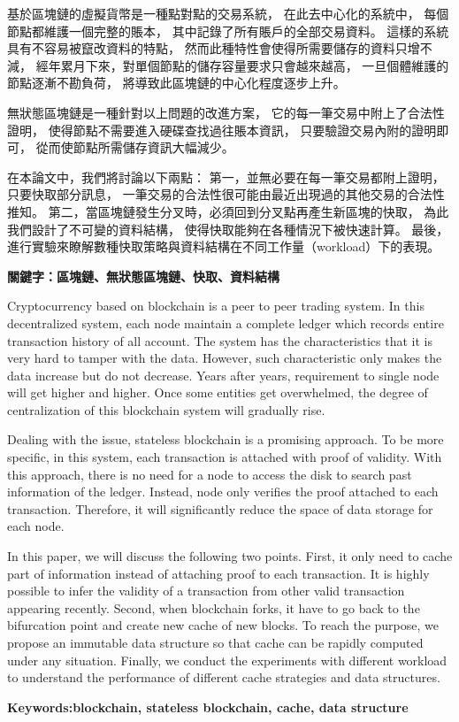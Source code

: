 \begin{abstractzh}
基於區塊鏈的虛擬貨幣是一種點對點的交易系統，
在此去中心化的系統中，
每個節點都維護一個完整的賬本，
其中記錄了所有賬戶的全部交易資料。
這樣的系統具有不容易被竄改資料的特點，
然而此種特性會使得所需要儲存的資料只增不減，
經年累月下來，對單個節點的儲存容量要求只會越來越高，
一旦個體維護的節點逐漸不勘負荷，
將導致此區塊鏈的中心化程度逐步上升。

無狀態區塊鏈是一種針對以上問題的改進方案，
它的每一筆交易中附上了合法性證明，
使得節點不需要進入硬碟查找過往賬本資訊，
只要驗證交易內附的證明即可，
從而使節點所需儲存資訊大幅減少。

在本論文中，我們將討論以下兩點：
第一，並無必要在每一筆交易都附上證明，
只要快取部分訊息，
一筆交易的合法性很可能由最近出現過的其他交易的合法性推知。
第二，當區塊鏈發生分叉時，必須回到分叉點再產生新區塊的快取，
為此我們設計了不可變的資料結構，
使得快取能夠在各種情況下被快速計算。
最後，進行實驗來瞭解數種快取策略與資料結構在不同工作量（workload）下的表現。


\bigbreak
\noindent \textbf{關鍵字：區塊鏈、無狀態區塊鏈、快取、資料結構}{\, \makeatletter \@keywordszh \makeatother}
\end{abstractzh}

\begin{abstracten}

Cryptocurrency based on blockchain is a peer to peer trading system. In this decentralized system, each node maintain a complete ledger which records entire transaction history of all account. The system has the characteristics that it is very hard to tamper with the data. However, such characteristic only makes the data increase but do not decrease. Years after years, requirement to single node will get higher and higher. Once some entities get overwhelmed, the degree of centralization of this blockchain system will gradually rise.

Dealing with the issue, stateless blockchain is a promising approach. To be more specific, in this system, each transaction is attached with proof of validity. With this approach, there is no need for a node to access the disk to search past information of the ledger. Instead, node only verifies the proof attached to each transaction. Therefore, it will significantly reduce the space of data storage for each node.

In this paper, we will discuss the following two points.
First, it only need to cache part of information instead of attaching proof to each transaction. It is highly possible to infer the validity of a transaction from other valid transaction appearing recently. Second, when blockchain forks, it have to go back to the bifurcation point and create new cache of new blocks. To reach the purpose, we propose an immutable data structure so that cache can be rapidly computed under any situation. Finally, we conduct the experiments with different workload to understand the performance of different cache strategies and data structures.

\bigbreak
\noindent \textbf{Keywords:blockchain, stateless blockchain, cache, data structure}{\, \makeatletter \@keywordsen \makeatother}
\end{abstracten}

